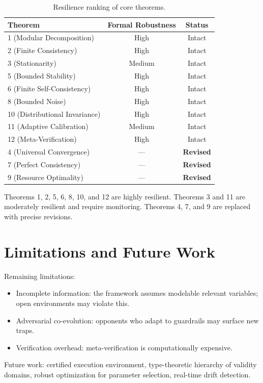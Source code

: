\documentclass[11pt]{article}
\theoremstyle{definition}
\begin{document}
\begin{table}[h]
\centering
\caption{Resilience ranking of core theorems.}
\begin{tabular}{lcc}
\toprule
\textbf{Theorem} & \textbf{Formal Robustness} & \textbf{Status} \\
\midrule
1 (Modular Decomposition) & High & Intact \\
2 (Finite Consistency) & High & Intact \\
3 (Stationarity) & Medium & Intact \\
5 (Bounded Stability) & High & Intact \\
6 (Finite Self-Consistency) & High & Intact \\
8 (Bounded Noise) & High & Intact \\
10 (Distributional Invariance) & High & Intact \\
11 (Adaptive Calibration) & Medium & Intact \\
12 (Meta-Verification) & High & Intact \\
\midrule
4 (Universal Convergence) & --- & \textbf{Revised} \\
7 (Perfect Consistency) & --- & \textbf{Revised} \\
9 (Resource Optimality) & --- & \textbf{Revised} \\
\bottomrule
\end{tabular}
\end{table}

Theorems 1, 2, 5, 6, 8, 10, and 12 are highly resilient. Theorems 3 and 11 are moderately
resilient and require monitoring. Theorems 4, 7, and 9 are replaced with precise revisions.

\section{Limitations and Future Work}
\label{sec:limits}

Remaining limitations:
\begin{itemize}
\item Incomplete information: the framework assumes modelable relevant variables; open
environments may violate this.
\item Adversarial co-evolution: opponents who adapt to guardrails may surface new traps.
\item Verification overhead: meta-verification is computationally expensive.
\end{itemize}

Future work: certified execution environment, type-theoretic hierarchy of validity domains,
robust optimization for parameter selection, real-time drift detection.
\end{document}
